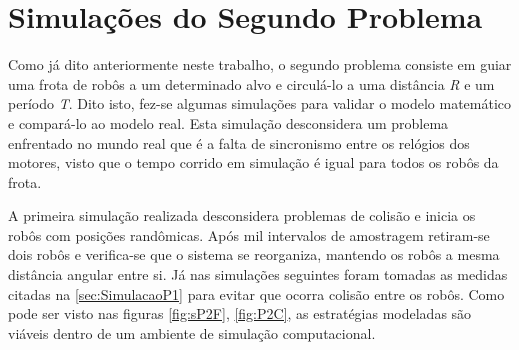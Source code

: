 \section{Simulações do Segundo Problema}
\label{sec:SimulacaoP2}
Como já dito anteriormente neste trabalho, o segundo problema consiste em guiar uma frota de robôs a um determinado alvo e circulá-lo a uma distância \emph{R} e um período \emph{T}. Dito isto, fez-se algumas simulações para validar o modelo matemático e compará-lo ao modelo real. Esta simulação desconsidera um problema enfrentado no mundo real que é a falta de sincronismo entre os relógios dos motores, visto que o tempo corrido em simulação é igual para todos os robôs da frota. 

A primeira simulação realizada desconsidera problemas de colisão e inicia os robôs com posições randômicas. Após mil intervalos de amostragem retiram-se dois robôs e verifica-se que o sistema se reorganiza, mantendo os robôs a mesma distância angular entre si. Já nas simulações seguintes foram tomadas as medidas citadas na \autoref{sec:SimulacaoP1} para evitar que ocorra colisão entre os robôs. Como pode ser visto nas figuras \ref{fig:sP2F}, \ref{fig:P2C}, as estratégias modeladas são viáveis dentro de um ambiente de simulação computacional.%

